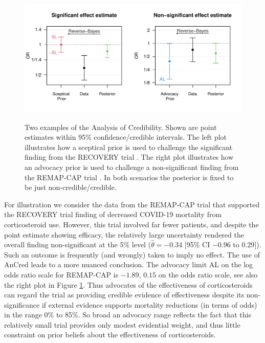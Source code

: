 \begin{figure}[!htb]
\begin{knitrout}
\color{fgcolor}
{\centering \includegraphics[width=\maxwidth]{images/paper4/AnCred-examples-plot-1}
}
\end{knitrout}
\caption{Two examples of the Analysis of Credibility. Shown are point estimates
  within 95\% confidence/credible intervals. The left plot illustrates how a
  sceptical prior is used to challenge the significant finding from the RECOVERY
  trial \citep{RECOVERY2020}. The right plot illustrates how an advocacy prior
  is used to challenge a non-significant finding from the REMAP-CAP trial
  \citep{REMAPCAP2020}. In both scenarios the posterior is fixed to be just
  non-credible/credible.}
\label{fig4:anCredEx}
\end{figure}

For illustration we consider the data from the REMAP-CAP trial that supported
the RECOVERY trial finding of decreased COVID-19 mortality from corticosteroid
use. However, this trial involved far fewer patients, and despite the point
estimate showing efficacy, the relatively large uncertainty rendered the overall
finding non-significant at the 5\% level ($\hat{\theta} = -0.34$ [95\% CI
$-0.96$ to $0.29$]). Such an outcome is frequently (and wrongly) taken to imply
no effect. The use of AnCred leads to a more nuanced conclusion. The advocacy
limit AL on the log odds ratio scale for REMAP-CAP is $-1.89$, \ie{} $0.15$ on the
odds ratio scale, see also the right plot in Figure \ref{fig4:anCredEx}. Thus
advocates of the effectiveness of corticosteroids can regard the trial as
providing credible evidence of effectiveness despite its non-significance if
external evidence supports mortality reductions (in terms of odds) in the range
0\% to 85\%. So broad an advocacy range reflects the fact that this relatively
small trial provides only modest evidential weight, and thus little constraint
on prior beliefs about the effectiveness of corticosteroids.

